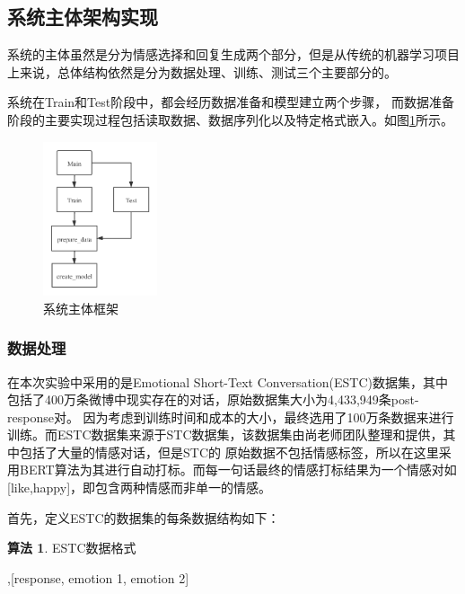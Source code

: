 \documentclass[supercite]{HustGraduPaper}
\theoremstyle{definition}
\newtheorem{alg}{算法}[section]
\begin{document}
\subsection{系统主体架构实现}
系统的主体虽然是分为情感选择和回复生成两个部分，但是从传统的机器学习项目上来说，总体结构依然是分为数据处理、训练、测试三个主要部分的。

系统在Train和Test阶段中，都会经历数据准备和模型建立两个步骤，
而数据准备阶段的主要实现过程包括读取数据、数据序列化以及特定格式嵌入。如图\ref{Fig.main}所示。
\begin{figure}[H] %
  \centering %
  \includegraphics[width=0.3\textwidth]{images/main.png} %
  \caption{系统主体框架} %
  \label{Fig.main} %
\end{figure}

\subsubsection{数据处理}
在本次实验中采用的是Emotional Short-Text Conversation(ESTC)数据集，其中包括了400万条微博中现实存在的对话，原始数据集大小为4,433,949条post-response对。
因为考虑到训练时间和成本的大小，最终选用了100万条数据来进行训练。而ESTC数据集来源于STC数据集，该数据集由尚老师团队整理和提供，其中包括了大量的情感对话，但是STC的
原始数据不包括情感标签，所以在这里采用BERT算法为其进行自动打标。而每一句话最终的情感打标结果为一个情感对如[like,happy]，即包含两种情感而非单一的情感。

首先，定义ESTC的数据集的每条数据结构如下：

\begin{shaded*}
  \begin{alg}{ESTC数据格式}
  \label{alg:ESTC}
  \begin{algorithmic}
    ,[response, emotion 1, emotion 2]
  \end{algorithmic}
  \end{alg}
\end{shaded*}
\end{document}
